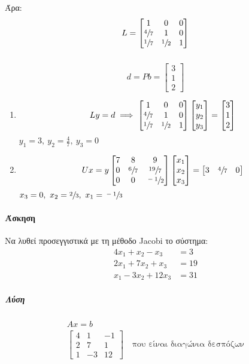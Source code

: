\documentclass[11pt,a4paper,notitlepage,fleqn]{article}
\begin{document}
Άρα: \[
L = \left[\begin{matrix}
1 & 0 & 0 \\
\sfrac{4}{7}  & 1 & 0 \\
\sfrac{1}{7}  & \sfrac{1}{2} & 1
\end{matrix}\right]
\]
\subparagraph{}
\[
d = Pb = \left[\begin{matrix}
3\\1\\2
\end{matrix}\right]
\]
\begin{enumerate}
	\item
	\[
	Ly = d \implies
	\left[\begin{matrix}
	1&0&0\\\sfrac{4}{7} &1&0\\\sfrac{1}{7} &\sfrac{1}{2} & 1
	\end{matrix}\right]\left[\begin{matrix}
	y_1\\y_2\\y_3
	\end{matrix}\right] = \left[\begin{matrix}
	3\\1\\2
	\end{matrix}\right]
	\]
	\( y_1 = 3,\ y_2 = \frac{4}{7},\ y_3=0 \)
	
	\item \[
	Ux = y \left[\begin{matrix}
	7&8&9\\0& \sfrac{6}{7}  & \sfrac{19}{7}  \\
	0 & 0 & \sfrac{-1}{2} 
	\end{matrix}\right]\left[\begin{matrix}
	x_1\\x_2\\x_3
	\end{matrix}\right] = \left[\begin{matrix}
	3&\sfrac{4}{7}  & 0
	\end{matrix}\right]
	\]
	\( x_3=0,\ x_2=\sfrac{2}{3},\ x_1 = \sfrac{-1}{3}   \)
\end{enumerate}

\paragraph{Άσκηση}
Να λυθεί προσεγγιστικά με τη μέθοδο Jacobi το σύστημα:
\begin{align*}
	4x_1+x_2-x_3 &= 3 \\
	2x_1+7x_2+x_3 &= 19 \\
	x_1-3x_2+12x_3 &= 31
\end{align*}
\subparagraph{Λύση}
\begin{gather*}
	Ax = b \\
	\left[\begin{matrix}
	4&1&-1 \\
	2&7&1 \\
	1&-3&12
	\end{matrix}\right] \quad \text{που είναι διαγώνια δεσπόζων}
\end{gather*}
\end{document}
